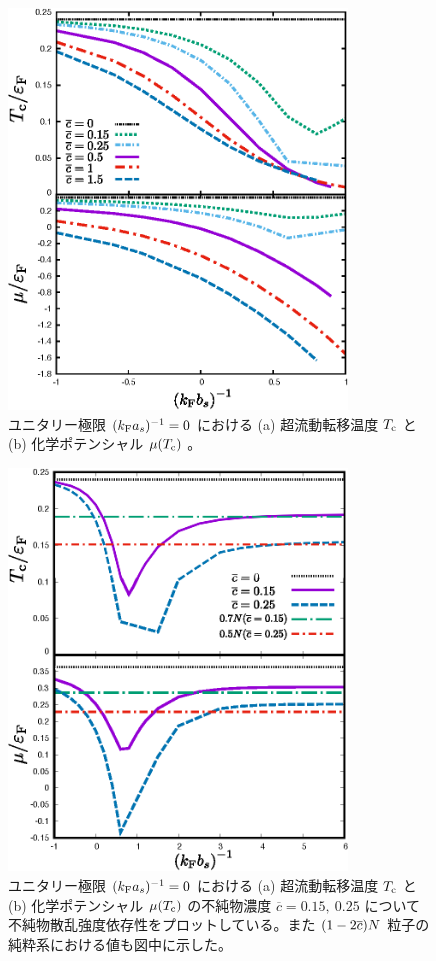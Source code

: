 \label{sec:bcsl:con}

\begin{figure}[t]
\centering
\includegraphics[width=90mm]{eps/tma-cpt-all.eps}
\caption{ユニタリー極限 $(k_{\text{F}} a_s)^{-1}=0$ における (a) 超流動転移温度 $T_{\text{c}}$ と (b)  化学ポテンシャル $\mu (T_{\text{c}})$ 。}
\label{fig:bcsl:con:tma-all}
\end{figure}



\begin{figure}[t]
\centering
\includegraphics[width=90mm]{eps/tma-cpt-large.eps}
\caption{ユニタリー極限 $(k_{\text{F}} a_s)^{-1}=0$ における (a) 超流動転移温度 $T_{\text{c}}$ と (b) 化学ポテンシャル $\mu(T_{\text{c}})$ の不純物濃度 $\overline{c}=0.15,\ 0.25$ について不純物散乱強度依存性をプロットしている。また $(1-2\overline{c})N$ 粒子の純粋系における値も図中に示した。}
\label{fig:bcsl:con:tma-wide}
\end{figure}

